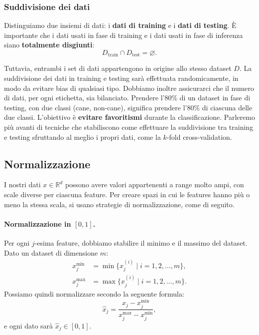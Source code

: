 \subsubsection*{Suddivisione dei dati}

Distinguiamo due insiemi di dati: i \textbf{dati di training} e i \textbf{dati di testing}. \`E importante che i dati usati in fase di training e i dati usati in fase di inferenza siano \textbf{totalmente disgiunti}:
\[
D_{\text{train}} \cap D_{\text{test}} = \varnothing.
\]

Tuttavia, entrambi i set di dati appartengono in origine allo stesso dataset $D$. La suddivisione dei dati in training e testing sar\`a effettuata randomicamente, in modo da evitare bias di qualsiasi tipo. Dobbiamo inoltre assicurarci che il numero di dati, per ogni etichetta, sia bilanciato. Prendere l'80\% di un dataset in fase di testing, con due classi (cane, non-cane), significa prendere l'80\% di ciascuna delle due classi. L'obiettivo \`e \textbf{evitare favoritismi} durante la classificazione. Parleremo pi\`u avanti di tecniche che stabiliscono come effettuare la suddivisione tra training e testing sfruttando al meglio i propri dati, come la $k$-fold cross-validation.

\subsection{Normalizzazione}

I nostri dati $x \in \mathbb{R}^d$ possono avere valori appartenenti a range molto ampi, con scale diverse per ciascuna feature. Per creare spazi in cui le features hanno pi\`u o meno la stessa scala, si usano strategie di normalizzazione, come di seguito.

\paragraph{Normalizzazione in $[0,1]$.}
Per ogni $j$-esima feature, dobbiamo stabilire il minimo e il massimo del dataset. Dato un dataset di dimensione $m$:
\begin{align*}
  x_j^{\min } &= \min\{x_j^{(i)} \mid i = 1, 2, \dots, m\},\\
  x_j^{\max } &= \max\{x_j^{(i)} \mid i = 1, 2, \dots, m\}.
\end{align*}
Possiamo quindi normalizzare secondo la seguente formula:
\[
  \hat{x}_j = \frac{x_j - x_j^{\min}}{x_j^{\max} - x_j^{\min}},
\]
e ogni dato sar\`a $\hat{x}_j \in [0,1]$.

